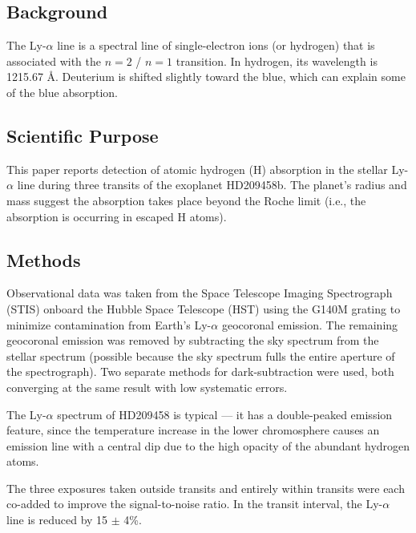 \documentclass[onecolumn]{aastex63}
\begin{document}

\subsection{Background}

The Ly-$\alpha$ line is a spectral line of single-electron ions (or hydrogen) that is associated with the $n=2$ / $n=1$ transition. In hydrogen, its wavelength is 1215.67 \r{A}. Deuterium is shifted slightly toward the blue, which can explain some of the blue absorption.

\subsection{Scientific Purpose}
This paper reports detection of atomic hydrogen (H) absorption in the stellar Ly-$\alpha$ line during three transits of the exoplanet HD209458b. The planet's radius and mass suggest the absorption takes place beyond the Roche limit (i.e., the absorption is occurring in escaped H atoms).

\subsection{Methods}
Observational data was taken from the Space Telescope Imaging Spectrograph (STIS) onboard the Hubble Space Telescope (HST) using the G140M grating to minimize contamination from Earth's Ly-$\alpha$ geocoronal emission. The remaining geocoronal emission was removed by subtracting the sky spectrum from the stellar spectrum (possible because the sky spectrum fulls the entire aperture of the spectrograph). Two separate methods for dark-subtraction were used, both converging at the same result with low systematic errors. 

The Ly-$\alpha$ spectrum of HD209458 is typical --- it has a double-peaked emission feature, since the temperature increase in the lower chromosphere causes an emission line with a central dip due to the high opacity of the abundant hydrogen atoms. 

The three exposures taken outside transits and entirely within transits were each co-added to improve the signal-to-noise ratio. In the transit interval, the Ly-$\alpha$ line is reduced by 15 $\pm$ 4\%. 
\end{document}
